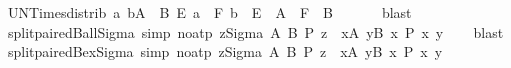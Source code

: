 \begin{isabellebody}
%
\endisadelimproof
\isanewline
{}\isamarkupfalse%
\ UN{\isacharunderscore}{\kern0pt}Times{\isacharunderscore}{\kern0pt}distrib{\isacharcolon}{\kern0pt}\ {\isachardoublequoteopen}{\isacharparenleft}{\kern0pt}{\isasymUnion}{\isacharparenleft}{\kern0pt}a{\isacharcomma}{\kern0pt}\ b{\isacharparenright}{\kern0pt}{\isasymin}A\ {\isasymtimes}\ B{\isachardot}{\kern0pt}\ E\ a\ {\isasymtimes}\ F\ b{\isacharparenright}{\kern0pt}\ {\isacharequal}{\kern0pt}\ {\isasymUnion}{\isacharparenleft}{\kern0pt}E\ {\isacharbackquote}{\kern0pt}\ A{\isacharparenright}{\kern0pt}\ {\isasymtimes}\ {\isasymUnion}{\isacharparenleft}{\kern0pt}F\ {\isacharbackquote}{\kern0pt}\ B{\isacharparenright}{\kern0pt}{\isachardoublequoteclose}\isanewline
\ \ %
\isanewline
%
\isadelimproof
\ \ %
\endisadelimproof
%
\isatagproof
{}\isamarkupfalse%
\ blast%
\endisatagproof
{\isafoldproof}%
%
\isadelimproof
\isanewline
%
\endisadelimproof
\isanewline
{}\isamarkupfalse%
\ split{\isacharunderscore}{\kern0pt}paired{\isacharunderscore}{\kern0pt}Ball{\isacharunderscore}{\kern0pt}Sigma\ {\isacharbrackleft}{\kern0pt}simp{\isacharcomma}{\kern0pt}\ no{\isacharunderscore}{\kern0pt}atp{\isacharbrackright}{\kern0pt}{\isacharcolon}{\kern0pt}\ {\isachardoublequoteopen}{\isacharparenleft}{\kern0pt}{\isasymforall}z{\isasymin}Sigma\ A\ B{\isachardot}{\kern0pt}\ P\ z{\isacharparenright}{\kern0pt}\ {\isasymlongleftrightarrow}\ {\isacharparenleft}{\kern0pt}{\isasymforall}x{\isasymin}A{\isachardot}{\kern0pt}\ {\isasymforall}y{\isasymin}B\ x{\isachardot}{\kern0pt}\ P\ {\isacharparenleft}{\kern0pt}x{\isacharcomma}{\kern0pt}\ y{\isacharparenright}{\kern0pt}{\isacharparenright}{\kern0pt}{\isachardoublequoteclose}\isanewline
%
\isadelimproof
\ \ %
\endisadelimproof
%
\isatagproof
{}\isamarkupfalse%
\ blast%
\endisatagproof
{\isafoldproof}%
%
\isadelimproof
\isanewline
%
\endisadelimproof
\isanewline
{}\isamarkupfalse%
\ split{\isacharunderscore}{\kern0pt}paired{\isacharunderscore}{\kern0pt}Bex{\isacharunderscore}{\kern0pt}Sigma\ {\isacharbrackleft}{\kern0pt}simp{\isacharcomma}{\kern0pt}\ no{\isacharunderscore}{\kern0pt}atp{\isacharbrackright}{\kern0pt}{\isacharcolon}{\kern0pt}\ {\isachardoublequoteopen}{\isacharparenleft}{\kern0pt}{\isasymexists}z{\isasymin}Sigma\ A\ B{\isachardot}{\kern0pt}\ P\ z{\isacharparenright}{\kern0pt}\ {\isasymlongleftrightarrow}\ {\isacharparenleft}{\kern0pt}{\isasymexists}x{\isasymin}A{\isachardot}{\kern0pt}\ {\isasymexists}y{\isasymin}B\ x{\isachardot}{\kern0pt}\ P\ {\isacharparenleft}{\kern0pt}x{\isacharcomma}{\kern0pt}\ y{\isacharparenright}{\kern0pt}{\isacharparenright}{\kern0pt}{\isachardoublequoteclose}\isanewline

\end{isabellebody}
